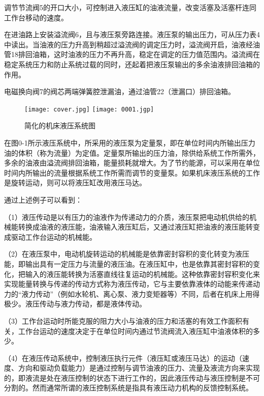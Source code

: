     调节节流阀5的开口大小，可控制进入液压缸的油液流量，改变活塞及活塞杆连同工作台移动的速度。

    在进油路上安装溢流阀6，且与液压泵旁路连接。液压泵的输出压力，可从压力表4中读出。当油液的压力升高到稍超过溢流阀的调定压力时，溢流阀开启，油液经油管18排回油箱，这时油液的压力不再升高，稳定在调定的压力值范围内。溢流阀在稳定系统压力和防止系统过载的同时，还起着把液压泵输出的多余油液排回油箱的作用。

    电磁换向阀7的阀芯两端弹簧腔泄漏油，通过油管22（泄漏口）排回油箱。

\begin{figure}[htbp]
    \centering
    \ifOpenSource
    \texttt{[image: cover.jpg]}
    \else
    \texttt{[image: 0001.jgp]}
    \fi
    \caption{简化的机床液压系统图}
    \label{fig:fig0001}
\end{figure}

    在图0-1所示液压系统中，所采用的液压泵为定量泵，即在单位时间内所输出压力油的体积（称为流量）为定值。定量泵所输出的压力油，除供给系统工作所需外，多余的油液由溢流阀排回油箱，能量损耗就增大。为了节约能源，可以采用在单位时间内所输出的流量根据系统工作所需而调节的变量泵。如果机床液压系统的工作是旋转运动，则可以将液压缸改用液压马达。

    通过上述例子可以看到：

    （1）液压传动是以有压力的油液作为传递动力的介质，液压泵把电动机供给的机械能转换成油液的液压能，油液输入液压缸后，又通过液压缸把油液的液压能转变成驱动工作台运动的机械能。

    （2）在液压泵中，电动机旋转运动的机械能是依靠密封容积的变化转变为液压能，即输出具有一定压力与流量的液压油。在液压缸中，也是依靠其密封容积的变化，把输入的液压能转换为活塞直线往复运动的机械能。这种依靠密封容积变化来实现能量转换与传递的传动方式称为液压传动，它与主要依靠液体的动能来传递动力的“液力传动”（例如水轮机、离心泵、液力变矩器等）不同，后者在机床上用得极少。液压传动与液力传动，都是液体传动。

    （3）工作台运动时所能克服的阻力大小与油液的压力和活塞的有效工作面积有关，工作台运动的速度决定于在单位时间内通过节流阀流入液压缸中油液体积的多少。

    （4）在液压传动系统中，控制液压执行元件（液压缸或液压马达）的运动（速度、方向和驱动负载能力）是通过控制与调节油液的压力、流量及液流方向来实现的，即液流是处在液压控制的状态下进行工作的，因此液压传动与液压控制是不可分割的。然而通常所谓的液压控制系统是指具有液压动力机构的反馈控制系统。


